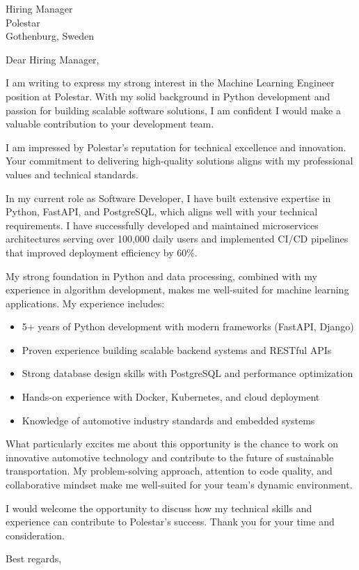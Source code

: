 \documentclass[11pt,a4paper]{letter}
\begin{document}
\begin{letter}{Hiring Manager \\ Polestar \\ Gothenburg, Sweden}

\opening{Dear Hiring Manager,}

I am writing to express my strong interest in the Machine Learning Engineer position at Polestar. With my solid background in Python development and passion for building scalable software solutions, I am confident I would make a valuable contribution to your development team.

I am impressed by Polestar's reputation for technical excellence and innovation. Your commitment to delivering high-quality solutions aligns with my professional values and technical standards.

In my current role as Software Developer, I have built extensive expertise in Python, FastAPI, and PostgreSQL, which aligns well with your technical requirements. I have successfully developed and maintained microservices architectures serving over 100,000 daily users and implemented CI/CD pipelines that improved deployment efficiency by 60\%.

My strong foundation in Python and data processing, combined with my experience in algorithm development, makes me well-suited for machine learning applications. My experience includes:

\begin{itemize}
\item 5+ years of Python development with modern frameworks (FastAPI, Django)
\item Proven experience building scalable backend systems and RESTful APIs
\item Strong database design skills with PostgreSQL and performance optimization
\item Hands-on experience with Docker, Kubernetes, and cloud deployment
\item Knowledge of automotive industry standards and embedded systems
\end{itemize}

What particularly excites me about this opportunity is the chance to work on innovative automotive technology and contribute to the future of sustainable transportation. My problem-solving approach, attention to code quality, and collaborative mindset make me well-suited for your team's dynamic environment.

I would welcome the opportunity to discuss how my technical skills and experience can contribute to Polestar's success. Thank you for your time and consideration.

\closing{Best regards,}

\end{letter}
\end{document}

